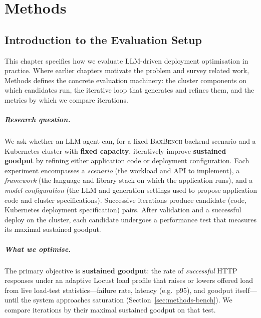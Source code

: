 
\chapter{Methods}
\label{ch:methods}


\section{Introduction to the Evaluation Setup}
\label{sec:methods-overview}

This chapter specifies how we evaluate LLM-driven deployment optimisation in
practice.  Where earlier chapters motivate the problem and survey related work,
Methods defines the concrete evaluation machinery: the cluster components on
which candidates run, the iterative loop that generates and refines them, and
the metrics by which we compare iterations.

\paragraph{Research question.}
We ask whether an LLM agent can, for a fixed \textsc{BaxBench} backend scenario
and a Kubernetes cluster with \textbf{fixed capacity}, iteratively improve
\textbf{sustained goodput} by refining either application code or deployment
configuration.  Each experiment encompasses a \emph{scenario} (the workload and
API to implement), a \emph{framework} (the language and library stack on which
the application runs), and a \emph{model configuration} (the LLM and generation
settings used to propose application code and cluster specifications).
Successive iterations produce candidate (code, Kubernetes deployment
specification) pairs.  After validation and a successful deploy on the cluster,
each candidate undergoes a performance test that measures its maximal sustained
goodput.

\paragraph{What we optimise.}
The primary objective is \textbf{sustained goodput}: the rate of
\emph{successful} HTTP responses under an adaptive Locust load profile that
raises or lowers offered load from live load-test statistics---failure rate,
latency (e.g.\ p95), and goodput itself---until the system approaches
saturation (Section~\ref{sec:methods-bench}).  We compare iterations by their
maximal sustained goodput on that test.

